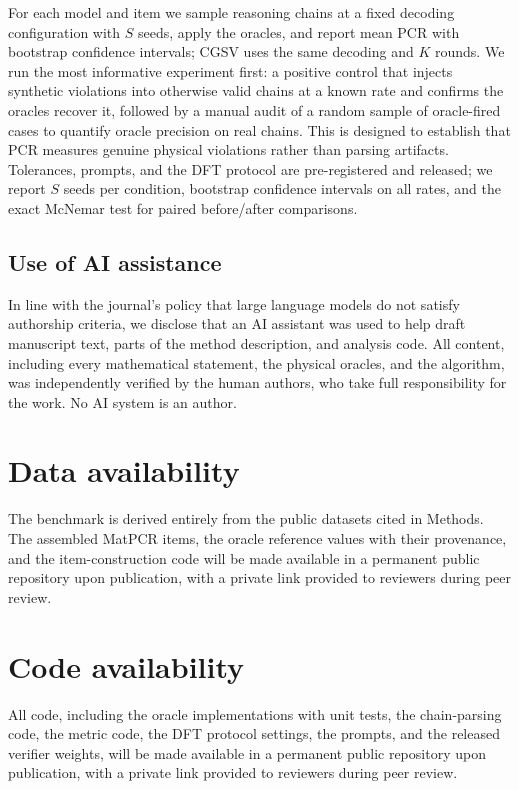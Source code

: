 \documentclass[pdflatex,sn-nature]{sn-jnl}
\begin{document}
For each model and item we sample reasoning chains at a fixed decoding configuration
with $S$ seeds, apply the oracles, and report mean PCR with bootstrap confidence
intervals; CGSV uses the same decoding and $K$ rounds. We run the most informative
experiment first: a positive control that injects synthetic violations into otherwise
valid chains at a known rate and confirms the oracles recover it, followed by a manual
audit of a random sample of oracle-fired cases to quantify oracle precision on real
chains. This is designed to establish that PCR measures genuine physical violations
rather than parsing artifacts. Tolerances, prompts, and the DFT protocol are pre-registered and
released; we report $S$ seeds per condition, bootstrap confidence intervals on all
rates, and the exact McNemar test for paired before/after comparisons.

\subsection*{Use of AI assistance}
In line with the journal's policy that large language models do not satisfy
authorship criteria, we disclose that an AI assistant was used to help draft
manuscript text, parts of the method description, and analysis code. All content,
including every mathematical statement, the physical oracles, and the algorithm, was
independently verified by the human authors, who take full responsibility for the
work. No AI system is an author.

\section*{Data availability}
The benchmark is derived entirely from the public datasets cited in
Methods.\cite{simxrd2024,opxrd2025,matproj2013} The assembled MatPCR items, the oracle
reference values with their provenance, and the item-construction code will be made
available in a permanent public repository upon publication, with a private link
provided to reviewers during peer review.

\section*{Code availability}
All code, including the oracle implementations with unit tests, the chain-parsing
code, the metric code, the DFT protocol settings, the prompts, and the released
verifier weights, will be made available in a permanent public repository upon
publication, with a private link provided to reviewers during peer review.
\end{document}
